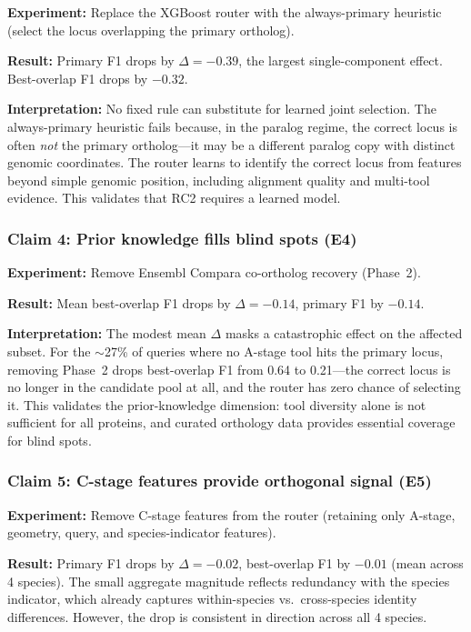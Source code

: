 \textbf{Experiment:} Replace the XGBoost router with the always-primary heuristic (select the locus overlapping the primary ortholog).

\textbf{Result:} Primary F1 drops by $\Delta = -0.39$, the largest single-component effect. Best-overlap F1 drops by $-0.32$.

\textbf{Interpretation:} No fixed rule can substitute for learned joint selection. The always-primary heuristic fails because, in the paralog regime, the correct locus is often \emph{not} the primary ortholog---it may be a different paralog copy with distinct genomic coordinates. The router learns to identify the correct locus from features beyond simple genomic position, including alignment quality and multi-tool evidence. This validates that RC2 requires a learned model.

\subsubsection{Claim 4: Prior knowledge fills blind spots (E4)}

\textbf{Experiment:} Remove Ensembl Compara co-ortholog recovery (Phase~2).

\textbf{Result:} Mean best-overlap F1 drops by $\Delta = -0.14$, primary F1 by $-0.14$.

\textbf{Interpretation:} The modest mean $\Delta$ masks a catastrophic effect on the affected subset. For the $\sim$27\% of queries where no A-stage tool hits the primary locus, removing Phase~2 drops best-overlap F1 from 0.64 to 0.21---the correct locus is no longer in the candidate pool at all, and the router has zero chance of selecting it. This validates the prior-knowledge dimension: tool diversity alone is not sufficient for all proteins, and curated orthology data provides essential coverage for blind spots.

\subsubsection{Claim 5: C-stage features provide orthogonal signal (E5)}

\textbf{Experiment:} Remove C-stage features from the router (retaining only A-stage, geometry, query, and species-indicator features).

\textbf{Result:} Primary F1 drops by $\Delta = -0.02$, best-overlap F1 by $-0.01$ (mean across 4 species). The small aggregate magnitude reflects redundancy with the species indicator, which already captures within-species vs.\ cross-species identity differences. However, the drop is consistent in direction across all 4 species.

